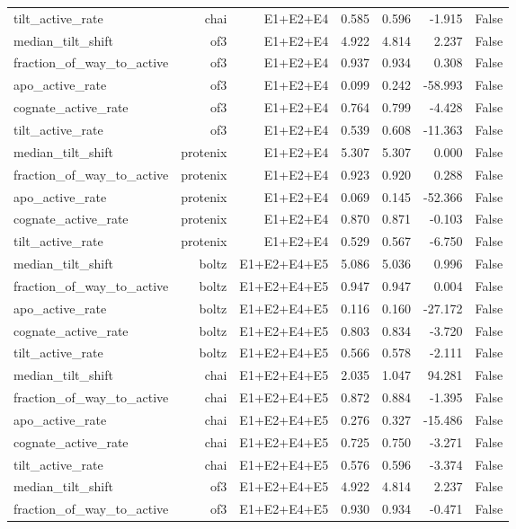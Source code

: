 \begin{longtable}{lrrrrrr}
tilt\_active\_rate & chai & E1+E2+E4 & 0.585 & 0.596 & -1.915 & False \\
median\_tilt\_shift & of3 & E1+E2+E4 & 4.922 & 4.814 & 2.237 & False \\
fraction\_of\_way\_to\_active & of3 & E1+E2+E4 & 0.937 & 0.934 & 0.308 & False \\
apo\_active\_rate & of3 & E1+E2+E4 & 0.099 & 0.242 & -58.993 & False \\
cognate\_active\_rate & of3 & E1+E2+E4 & 0.764 & 0.799 & -4.428 & False \\
tilt\_active\_rate & of3 & E1+E2+E4 & 0.539 & 0.608 & -11.363 & False \\
median\_tilt\_shift & protenix & E1+E2+E4 & 5.307 & 5.307 & 0.000 & False \\
fraction\_of\_way\_to\_active & protenix & E1+E2+E4 & 0.923 & 0.920 & 0.288 & False \\
apo\_active\_rate & protenix & E1+E2+E4 & 0.069 & 0.145 & -52.366 & False \\
cognate\_active\_rate & protenix & E1+E2+E4 & 0.870 & 0.871 & -0.103 & False \\
tilt\_active\_rate & protenix & E1+E2+E4 & 0.529 & 0.567 & -6.750 & False \\
median\_tilt\_shift & boltz & E1+E2+E4+E5 & 5.086 & 5.036 & 0.996 & False \\
fraction\_of\_way\_to\_active & boltz & E1+E2+E4+E5 & 0.947 & 0.947 & 0.004 & False \\
apo\_active\_rate & boltz & E1+E2+E4+E5 & 0.116 & 0.160 & -27.172 & False \\
cognate\_active\_rate & boltz & E1+E2+E4+E5 & 0.803 & 0.834 & -3.720 & False \\
tilt\_active\_rate & boltz & E1+E2+E4+E5 & 0.566 & 0.578 & -2.111 & False \\
median\_tilt\_shift & chai & E1+E2+E4+E5 & 2.035 & 1.047 & 94.281 & False \\
fraction\_of\_way\_to\_active & chai & E1+E2+E4+E5 & 0.872 & 0.884 & -1.395 & False \\
apo\_active\_rate & chai & E1+E2+E4+E5 & 0.276 & 0.327 & -15.486 & False \\
cognate\_active\_rate & chai & E1+E2+E4+E5 & 0.725 & 0.750 & -3.271 & False \\
tilt\_active\_rate & chai & E1+E2+E4+E5 & 0.576 & 0.596 & -3.374 & False \\
median\_tilt\_shift & of3 & E1+E2+E4+E5 & 4.922 & 4.814 & 2.237 & False \\
fraction\_of\_way\_to\_active & of3 & E1+E2+E4+E5 & 0.930 & 0.934 & -0.471 & False \\

\end{longtable}
